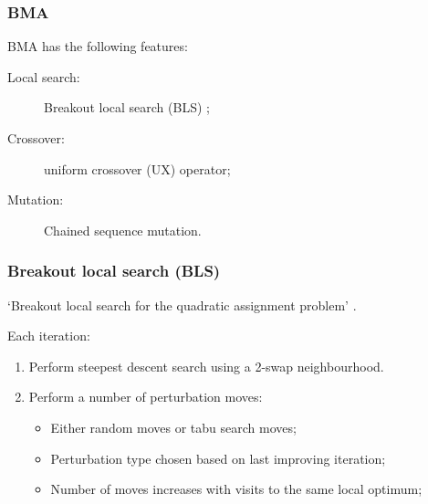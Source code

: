 {    \subsubsection{BMA \citep{Benlic:2015gp}} {
        BMA has the following features:
        \begin{description}
            \item[Local search:] Breakout local search (BLS) \citep{Benlic:2013gi};
            \item[Crossover:]  uniform crossover (UX) operator;
            \item[Mutation:] Chained sequence mutation.
        \end{description}
    }

    \subsubsection{Breakout local search (BLS)} {
        `Breakout local search for the quadratic assignment problem' \citep{Benlic:2013gi}.

        Each iteration:
        \begin{enumerate}
            \item Perform steepest descent search using a 2-swap neighbourhood.
            \item Perform a number of perturbation moves:
                \begin{itemize}
                    \item Either random moves or tabu search moves;
                    \item Perturbation type chosen based on last improving iteration;
                    \item Number of moves increases with visits to the same local optimum;
                \end{itemize}
        \end{enumerate}
    }

}
